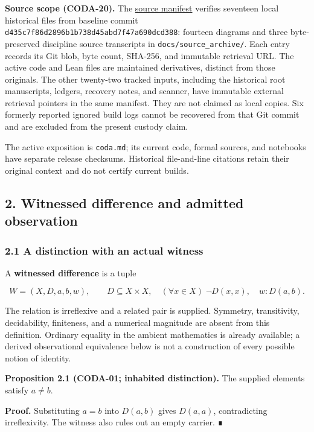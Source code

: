\documentclass[
  11pt,
]{article}
\begin{document}
\textbf{Source scope (CODA-20).} The \href{source_manifest.json}{source manifest} verifies seventeen local historical files from baseline commit \nolinkurl{d435c7f86d2896b1b738d45abd7f47a690dcd388}: fourteen diagrams and three byte-preserved discipline source transcripts in \nolinkurl{docs/source_archive/}. Each entry records its Git blob, byte count, SHA-256, and immutable retrieval URL. The active code and Lean files are maintained derivatives, distinct from those originals. The other twenty-two tracked inputs, including the historical root manuscripts, ledgers, recovery notes, and scanner, have immutable external retrieval pointers in the same manifest. They are not claimed as local copies. Six formerly reported ignored build logs cannot be recovered from that Git commit and are excluded from the present custody claim.

The active exposition is \texttt{coda.md}; its current code, formal sources, and notebooks have separate release checksums. Historical file-and-line citations retain their original context and do not certify current builds.

\subsection{2. Witnessed difference and admitted observation}\label{witnessed-difference-and-admitted-observation}

\subsubsection{2.1 A distinction with an actual witness}\label{a-distinction-with-an-actual-witness}

A \textbf{witnessed difference} is a tuple

\[
 W=(X,D,a,b,w),\qquad D\subseteq X\times X,
 \quad (\forall x\in X)\;\neg D(x,x),\quad w:D(a,b).
\]

The relation is irreflexive and a related pair is supplied. Symmetry, transitivity, decidability, finiteness, and a numerical magnitude are absent from this definition. Ordinary equality in the ambient mathematics is already available; a derived observational equivalence below is not a construction of every possible notion of identity.

\textbf{Proposition 2.1 (CODA-01; inhabited distinction).} The supplied elements satisfy \(a\ne b\).

\textbf{Proof.} Substituting \(a=b\) into \(D(a,b)\) gives \(D(a,a)\), contradicting irreflexivity. The witness also rules out an empty carrier. ∎
\end{document}
